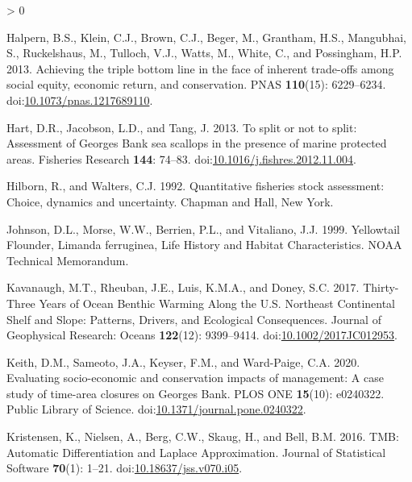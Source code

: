 \documentclass[
]{article}
\newlength{\cslhangindent}
\newenvironment{CSLReferences}[2] %
 {%
  \setlength{\parindent}{0pt}
  \ifodd #1 \everypar{\setlength{\hangindent}{\cslhangindent}}\ignorespaces\fi
  \ifnum #2 > 0
  \setlength{\parskip}{#2\baselineskip}
  \fi
 }%
 {}
\begin{document}
\begin{CSLReferences}{1}{0}
\leavevmode\hypertarget{ref-halpernAchievingTripleBottom2013}{}%
Halpern, B.S., Klein, C.J., Brown, C.J., Beger, M., Grantham, H.S., Mangubhai, S., Ruckelshaus, M., Tulloch, V.J., Watts, M., White, C., and Possingham, H.P. 2013. Achieving the triple bottom line in the face of inherent trade-offs among social equity, economic return, and conservation. PNAS \textbf{110}(15): 6229--6234. doi:\href{https://doi.org/10.1073/pnas.1217689110}{10.1073/pnas.1217689110}.

\leavevmode\hypertarget{ref-hartSplitNotSplit2013}{}%
Hart, D.R., Jacobson, L.D., and Tang, J. 2013. To split or not to split: {Assessment} of {Georges Bank} sea scallops in the presence of marine protected areas. Fisheries Research \textbf{144}: 74--83. doi:\href{https://doi.org/10.1016/j.fishres.2012.11.004}{10.1016/j.fishres.2012.11.004}.

\leavevmode\hypertarget{ref-hilbornQuantitativeFisheriesStock1992}{}%
Hilborn, R., and Walters, C.J. 1992. Quantitative fisheries stock assessment: Choice, dynamics and uncertainty. {Chapman and Hall}, {New York}.

\leavevmode\hypertarget{ref-johnsonYellowtailFlounderLimanda1999}{}%
Johnson, D.L., Morse, W.W., Berrien, P.L., and Vitaliano, J.J. 1999. Yellowtail {Flounder}, {Limanda} ferruginea, {Life History} and {Habitat Characteristics}. NOAA Technical Memorandum.

\leavevmode\hypertarget{ref-kavanaughThirtyThreeYearsOcean2017}{}%
Kavanaugh, M.T., Rheuban, J.E., Luis, K.M.A., and Doney, S.C. 2017. Thirty-{Three Years} of {Ocean Benthic Warming Along} the {U}.{S}. {Northeast Continental Shelf} and {Slope}: {Patterns}, {Drivers}, and {Ecological Consequences}. Journal of Geophysical Research: Oceans \textbf{122}(12): 9399--9414. doi:\href{https://doi.org/10.1002/2017JC012953}{10.1002/2017JC012953}.

\leavevmode\hypertarget{ref-keithEvaluatingSocioeconomicConservation2020}{}%
Keith, D.M., Sameoto, J.A., Keyser, F.M., and Ward-Paige, C.A. 2020. Evaluating socio-economic and conservation impacts of management: {A} case study of time-area closures on {Georges Bank}. PLOS ONE \textbf{15}(10): e0240322. {Public Library of Science}. doi:\href{https://doi.org/10.1371/journal.pone.0240322}{10.1371/journal.pone.0240322}.

\leavevmode\hypertarget{ref-kristensenTMBAutomaticDifferentiation2016}{}%
Kristensen, K., Nielsen, A., Berg, C.W., Skaug, H., and Bell, B.M. 2016. {TMB}: {Automatic Differentiation} and {Laplace Approximation}. Journal of Statistical Software \textbf{70}(1): 1--21. doi:\href{https://doi.org/10.18637/jss.v070.i05}{10.18637/jss.v070.i05}.


\end{CSLReferences}
\end{document}
